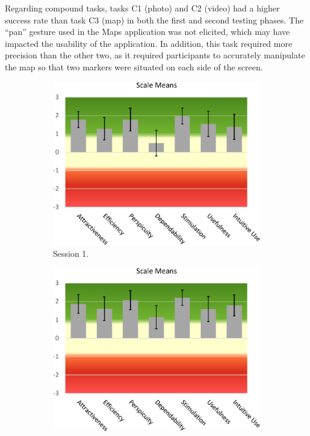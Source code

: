 Regarding compound tasks, tasks C1 (photo) and C2 (video) had a higher success rate than task C3 (map) in both the first and second testing phases. The ``pan'' gesture used in the Maps application was not elicited, which may have impacted the usability of the application. In addition, this task required more precision than the other two, as it required participants to accurately manipulate the map so that two markers were situated on each side of the screen.

\begin{figure}[!b]
    \centering
    \begin{subfigure}{.495\linewidth}
        \includegraphics[width=\linewidth]{Figures/LUI/Evaluation/ueq+_session_1_scale_means.pdf}
        \caption{Session 1.}
        \label{fig:lui:ueqplus-scales:session1}
    \end{subfigure}
    \begin{subfigure}{.495\linewidth}
        \includegraphics[width=\linewidth]{Figures/LUI/Evaluation/ueq+_session_2_scale_means.pdf}

\end{subfigure}
\end{figure}

